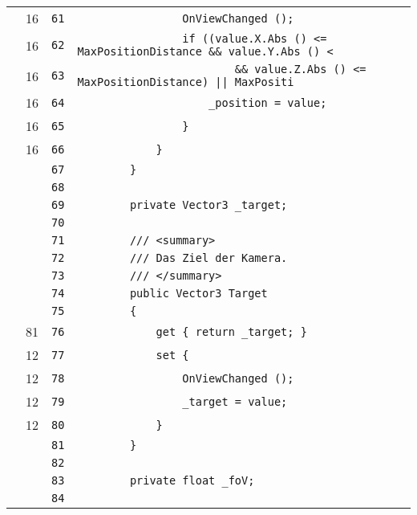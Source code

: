 \documentclass[a4paper,10pt]{article}
\begin{document}
\begin{longtable}[l]{lrrl}
\cellcolor{green} & 16 & \verb~61~ & \verb~                OnViewChanged ();~\\
\cellcolor{green} & 16 & \verb~62~ & \verb~                if ((value.X.Abs () <= MaxPositionDistance && value.Y.Abs () <~\\
\cellcolor{green} & 16 & \verb~63~ & \verb~                        && value.Z.Abs () <= MaxPositionDistance) || MaxPositi~\\
\cellcolor{green} & 16 & \verb~64~ & \verb~                    _position = value;~\\
\cellcolor{green} & 16 & \verb~65~ & \verb~                }~\\
\cellcolor{green} & 16 & \verb~66~ & \verb~            }~\\
\cellcolor{gray} &  & \verb~67~ & \verb~        }~\\
\cellcolor{gray} &  & \verb~68~ & \verb~~\\
\cellcolor{gray} &  & \verb~69~ & \verb~        private Vector3 _target;~\\
\cellcolor{gray} &  & \verb~70~ & \verb~~\\
\cellcolor{gray} &  & \verb~71~ & \verb~        /// <summary>~\\
\cellcolor{gray} &  & \verb~72~ & \verb~        /// Das Ziel der Kamera.~\\
\cellcolor{gray} &  & \verb~73~ & \verb~        /// </summary>~\\
\cellcolor{gray} &  & \verb~74~ & \verb~        public Vector3 Target~\\
\cellcolor{gray} &  & \verb~75~ & \verb~        {~\\
\cellcolor{green} & 81 & \verb~76~ & \verb~            get { return _target; }~\\
\cellcolor{green} & 12 & \verb~77~ & \verb~            set {~\\
\cellcolor{green} & 12 & \verb~78~ & \verb~                OnViewChanged ();~\\
\cellcolor{green} & 12 & \verb~79~ & \verb~                _target = value;~\\
\cellcolor{green} & 12 & \verb~80~ & \verb~            }~\\
\cellcolor{gray} &  & \verb~81~ & \verb~        }~\\
\cellcolor{gray} &  & \verb~82~ & \verb~~\\
\cellcolor{gray} &  & \verb~83~ & \verb~        private float _foV;~\\
\cellcolor{gray} &  & \verb~84~ & \verb~~\\

\end{longtable}
\end{document}

